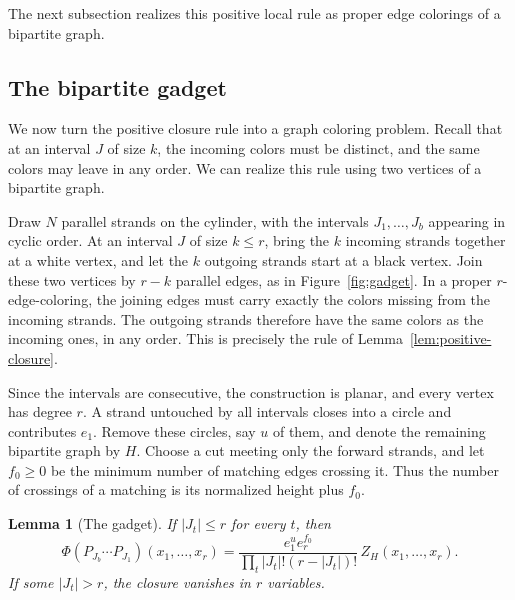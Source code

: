 \documentclass[11pt]{article}
\newtheorem{lemma}[theorem]{Lemma}
\theoremstyle{definition}
\theoremstyle{remark}
\begin{document}
The next subsection realizes this positive local
rule as proper edge colorings of a bipartite graph.






\subsection{The bipartite gadget}

We now turn the positive closure rule into a graph
coloring problem. Recall that at an interval $J$
of size $k$, the incoming colors must be distinct,
and the same colors may leave in any order.
We can realize this rule using two vertices of
a bipartite graph.

Draw $N$ parallel strands on the cylinder, with
the intervals $J_1,\ldots,J_b$ appearing in cyclic
order. At an interval $J$ of size $k\le r$,
bring the $k$ incoming strands together at a white
vertex, and let the $k$ outgoing strands start
at a black vertex. Join these two vertices by
$r-k$ parallel edges, as in Figure~\ref{fig:gadget}.
In a proper $r$-edge-coloring, the joining edges
must carry exactly the colors missing from the
incoming strands. The outgoing strands therefore
have the same colors as the incoming ones, in
any order. This is precisely the rule of
Lemma~\ref{lem:positive-closure}.

Since the intervals are consecutive, the
construction is planar, and every vertex has
degree $r$. A strand untouched by all intervals
closes into a circle and contributes $e_1$.
Remove these circles, say $u$ of them, and
denote the remaining bipartite graph by $H$.
Choose a cut meeting only the forward strands,
and let $f_0\ge0$ be the minimum number of
matching edges crossing it. Thus the number
of crossings of a matching is its normalized
height plus $f_0$.

\begin{lemma}[The gadget]\label{lem:gadget}
If $|J_t|\le r$ for every $t$, then
\begin{equation}\label{eq:gadget}
\Phi(P_{J_b}\cdots P_{J_1})(x_1,\ldots,x_r)
=\frac{e_1^u e_r^{f_0}}
{\prod_t |J_t|!(r-|J_t|)!}\,
Z_H(x_1,\ldots,x_r).
\end{equation}
If some $|J_t|>r$, the closure vanishes
in $r$ variables.
\end{lemma}
\end{document}
